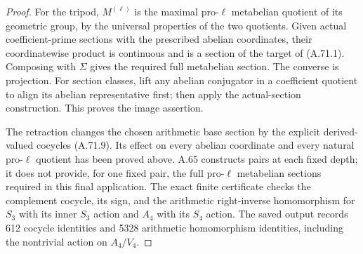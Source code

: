 \begin{proof}
For the tripod, $M^{(\ell)}$ is the maximal pro-$\ell$
metabelian quotient of its geometric group, by the universal
properties of the two quotients.
Given actual coefficient-prime sections with the prescribed
abelian coordinates, their coordinatewise product is continuous
and is a section of the target of (A.71.1).
Composing with $\Sigma$ gives the required full metabelian section.
The converse is projection.
For section classes, lift any abelian conjugator in a coefficient
quotient to align its abelian representative first; then apply the
actual-section construction.  This proves the image assertion.

The retraction changes the chosen arithmetic base section by the
explicit derived-valued cocycles (A.71.9).
Its effect on every abelian coordinate and every natural pro-$\ell$
quotient has been proved above.
A.65 constructs pairs at each fixed depth; it does not provide,
for one fixed pair, the full pro-$\ell$ metabelian sections required
in this final application.
The exact finite certificate
 checks the complement
cocycle, its sign, and the arithmetic right-inverse homomorphism
for $S_3$ with its inner $S_3$ action and $A_4$ with its $S_4$ action.
The saved output records 612 cocycle identities and 5328 arithmetic
homomorphism identities, including the nontrivial action on
$A_4/V_4$.
\end{proof}

